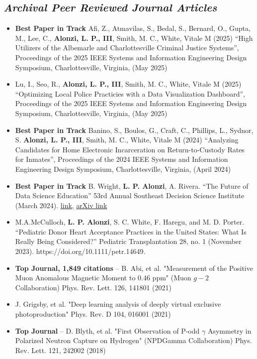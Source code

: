 \documentclass[10pt]{article}
\begin{document}
\subsection*{\emph{Archival Peer Reviewed Journal Articles}}
\begin{itemize}
\item {\bf \LARGE Best Paper in Track} Afi, Z., Atmavilas, S., Bedal, S., Bernard, O., Gupta, M., Lee, C., {\bf Alonzi, L. P., III}, Smith, M. C., White, Vitale M (2025) “High Utilizers of the Albemarle and Charlottesville Criminal Justice Systems”, Proceedings of the 2025 IEEE Systems and Information Engineering Design Symposium, Charlottesville, Virginia, (May 2025)
\item Lu, I., Seo, R., {\bf Alonzi, L. P., III}, Smith, M. C., White, Vitale M (2025) “Optimizing Local Police Practicies with a Data Visualization Dashboard”, Proceedings of the 2025 IEEE Systems and Information Engineering Design Symposium, Charlottesville, Virginia, (May 2025)
\item {\bf \LARGE Best Paper in Track} Banino, S., Boulos, G., Craft, C., Phillips, L., Sydnor, S. {\bf Alonzi, L. P., III}, Smith, M. C., White, Vitale M (2024) “Analyzing Candidates for Home Electronic Incarceration on Return-to-Custody Rates for Inmates”, Proceedings of the 2024 IEEE Systems and Information Engineering Design Symposium, Charlottesville, Virginia, (April 2024)
\item {\bf \LARGE Best Paper in Track} B. Wright, {\bf L. P. Alonzi}, A. Rivera. “The Future of Data Science Education” 53rd Annual Southeast Decision Science Institute (March 2024). \href{https://sedsi.decisionsciences.org/wp-content/uploads/sites/7/2024/08/SEDSI-2024-Proceedings-2.pdf}{link}, \href{https://arxiv.org/abs/2407.11824.}{arXiv link}
\item M.A.McCulloch, {\bf L. P. Alonzi}, S. C. White, F. Haregu, and M. D. Porter. “Pediatric Donor Heart Acceptance Practices in the United States: What Is Really Being Considered?” Pediatric Transplantation 28, no. 1 (November 2023). https://doi.org/10.1111/petr.14649.
\item {\bf \LARGE Top Journal, 1,849 citations} -- B. Abi, et al. "Measurement of the Positive Muon Anomalous Magnetic Moment to 0.46 ppm" (Muon $g-2$ Collaboration) Phys. Rev. Lett. 126, 141801 (2021)
\item J. Grigsby, et al. "Deep learning analysis of deeply virtual exclusive photoproduction" Phys. Rev. D 104, 016001 (2021)
\item {\bf \LARGE Top Journal} -- D. Blyth, et al. "First Observation of P-odd $\gamma$ Asymmetry in Polarized Neutron Capture on Hydrogen" (NPDGamma Collaboration) Phys. Rev. Lett. 121, 242002 (2018)

\end{itemize}
\end{document}
